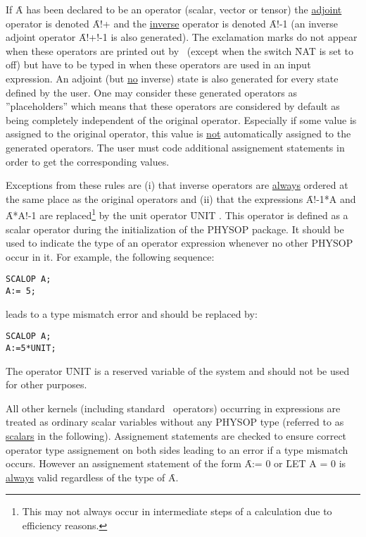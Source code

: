 If \f{A} has been declared to be an operator (scalar, vector or tensor)
the \underline{adjoint} operator is denoted \f{A!+} and the
\underline{inverse}
operator is denoted \f{A!-1} (an inverse adjoint operator \f{A!+!-1}
is also generated).
The exclamation marks do not appear
when these operators are printed out by \REDUCE\ (except when the switch
\f{NAT} is set to off)
but have to be typed in when these operators are used in an input
expression.
An adjoint (but \underline{no} inverse)  state  is also
generated  for every state defined by the user.
One may consider these generated operators as ''placeholders'' which
means that these operators are considered by default as
being completely independent of the original operator.
Especially if some value is assigned to the original operator,
this value is \underline{not} automatically assigned to the
generated operators. The user must code additional assignement
statements in order to get the corresponding values.

Exceptions from these rules are (i) that inverse operators are
\underline{always} ordered at the same place as the original operators
and (ii) that  the expressions \f{A!-1*A}
and \f{A*A!-1} are replaced\footnote{This may not always occur in
intermediate steps of a calculation  due to efficiency reasons.}
by the unit operator \f{UNIT} .
This operator is defined
as a scalar operator during the initialization of the PHYSOP package.
It should be used to indicate
the type of an operator expression whenever no other PHYSOP
occur in it. For example, the following sequence: \\

\begin{verbatim}
SCALOP A;
A:= 5;
\end{verbatim}
leads to a type mismatch error and should be replaced by: \\

\begin{verbatim}
SCALOP A;
A:=5*UNIT;
\end{verbatim}
The operator \f{UNIT} is a reserved variable of the system and should
not be used for other purposes.

All other kernels  (including standard \REDUCE\ operators)
occurring in expressions are treated as ordinary scalar variables
without any PHYSOP type (referred to as \underline{scalars} in the
following).
Assignement statements are checked to ensure correct operator
type assignement on both sides leading to an error if a type
mismatch occurs. However an assignement statement of the form
\f{A:= 0} or \f{LET A = 0} is \underline{always} valid regardless of the
type of \f{A}.

